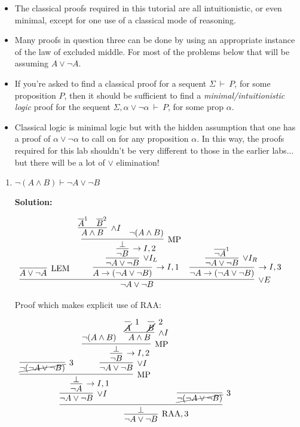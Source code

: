 \documentclass[11pt]{report}
\newcommand{\temp}[2]{{\overline{#2}}^{#1}}
\begin{document}
\begin{enumerate}
	\begin{itemize}
		\item[] The classical proofs required in this tutorial are all intuitionistic, or even minimal, except for one use of a classical mode of reasoning. 
		\item[] Many proofs in question three can be done by using an appropriate instance of the law of excluded middle. For most of the problems below that will be assuming $A \lor \lnot A$. 
		\item[] If you're asked to find a classical proof for a sequent $\Sigma \ \vdash \ P$, for some proposition $P$, then it should be sufficient to find a \emph{minimal/intuitionistic logic} proof for the sequent $\Sigma, \alpha \lor \lnot \alpha \ \vdash \ P$, for some prop $\alpha$. 
		\item[] Classical logic is minimal logic but with the hidden assumption that one has a proof of $\alpha \lor \lnot \alpha$ to call on for any proposition $\alpha$. In this way, the proofs required for this lab shouldn't be very different to those in the earlier labs... but there will be a lot of $\lor$ elimination!  
	\end{itemize}


	\newpage
	\begin{enumerate}
		\item $\neg(A \land  B) \vdash  \neg  A \lor \neg  B$  
		
		\textbf{Solution:}

		\begin{center}
			$\begin{array}{c}
				\infer[\lor E]{\lnot A \lor \lnot B}
					{\infer[\LEM]{A \lor \lnot A}{}
					&
					\infer[\to I, 1]{A \to (\lnot A \lor \lnot B)}
						{\infer[\lor I_{L}]{\lnot A \lor \lnot B}
							{\infer[\to I,2]{\lnot B}
								{\infer[\MP]{\bot}
									{\infer[\land I]{A \land B}
										{\temp{1}{A}&\temp{2}{B}}
									&
									\lnot(A \land B)}}}}
					&
					\infer[\to I,3]{\lnot A \to (\lnot A \lor \lnot B)}
						{\infer[\lor I_{R}]{\lnot A \lor \lnot B}
							{\temp{1}{\lnot A}}}}
			\end{array}$
		\end{center}

		Proof which makes explicit use of RAA: 

		\begin{center}
				$\begin{array}{c}
					\infer[\RAA,3]{\lnot A \lor \lnot B}
						{\infer[]{\bot}
							{\infer[\lor I]{\lnot A \lor \lnot B}
								{\infer[\to I,1]{\lnot A}
									{\infer[\MP]{\bot}
										{\infer[3]{\cancel{\lnot(\lnot A \lor \lnot B)}}
											{}
										&
										\infer[\lor I]{\lnot A \lor \lnot B}
											{\infer[\to I,2]{\lnot B}
												{\infer[\MP]{\bot}
													{\lnot(A \land B)
													&
													\infer[\land I]{A \land B}
														{\infer[1]{\cancel{A}}{}
														&
														\infer[2]{\cancel{B}}{}}}}}}}}
							&
							\infer[3]{\cancel{\lnot(\lnot A \lor \lnot B)}}{}}}
				\end{array}$
			\end{center}
		

\end{enumerate}
\end{enumerate}
\end{document}

